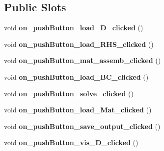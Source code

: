 \subsection*{Public Slots}
\begin{DoxyCompactItemize}
\item 
void {\bfseries on\+\_\+push\+Button\+\_\+load\+\_\+D\+\_\+clicked} ()\hypertarget{class_m_a_p___main_window_ae4a6167f8bf7cbf951bd46176db08db7}{}\label{class_m_a_p___main_window_ae4a6167f8bf7cbf951bd46176db08db7}

\item 
void {\bfseries on\+\_\+push\+Button\+\_\+load\+\_\+\+R\+H\+S\+\_\+clicked} ()\hypertarget{class_m_a_p___main_window_a8c70320cb0812e595be1e00b78313ef8}{}\label{class_m_a_p___main_window_a8c70320cb0812e595be1e00b78313ef8}

\item 
void {\bfseries on\+\_\+push\+Button\+\_\+mat\+\_\+assemb\+\_\+clicked} ()\hypertarget{class_m_a_p___main_window_a981ee2396aa714dc4f866c5b54de8fb4}{}\label{class_m_a_p___main_window_a981ee2396aa714dc4f866c5b54de8fb4}

\item 
void {\bfseries on\+\_\+push\+Button\+\_\+load\+\_\+\+B\+C\+\_\+clicked} ()\hypertarget{class_m_a_p___main_window_a9645521f9d25fb884e3224808aae22e7}{}\label{class_m_a_p___main_window_a9645521f9d25fb884e3224808aae22e7}

\item 
void {\bfseries on\+\_\+push\+Button\+\_\+solve\+\_\+clicked} ()\hypertarget{class_m_a_p___main_window_a724b9dd161e1335adf30e2241dcfc7ee}{}\label{class_m_a_p___main_window_a724b9dd161e1335adf30e2241dcfc7ee}

\item 
void {\bfseries on\+\_\+push\+Button\+\_\+load\+\_\+\+Mat\+\_\+clicked} ()\hypertarget{class_m_a_p___main_window_a51bc8feda793ed3638d6e4f6ade21da3}{}\label{class_m_a_p___main_window_a51bc8feda793ed3638d6e4f6ade21da3}

\item 
void {\bfseries on\+\_\+push\+Button\+\_\+save\+\_\+output\+\_\+clicked} ()\hypertarget{class_m_a_p___main_window_a39a15dc6c6445758e02ec682f25c95ba}{}\label{class_m_a_p___main_window_a39a15dc6c6445758e02ec682f25c95ba}

\item 
void {\bfseries on\+\_\+push\+Button\+\_\+vis\+\_\+D\+\_\+clicked} ()\hypertarget{class_m_a_p___main_window_ae9a7a0b27b489061a3d6563b186b439d}{}\label{class_m_a_p___main_window_ae9a7a0b27b489061a3d6563b186b439d}

\end{DoxyCompactItemize}
